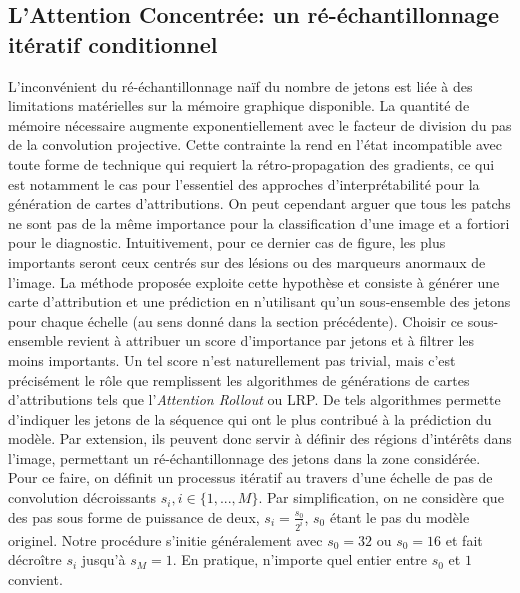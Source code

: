 \subsection{L'Attention Concentrée: un ré-échantillonnage itératif conditionnel}

L'inconvénient du ré-échantillonnage naïf du nombre de jetons est liée à des limitations matérielles sur la mémoire graphique disponible. La quantité de mémoire nécessaire augmente exponentiellement avec le facteur de division du pas de la convolution projective. Cette contrainte la rend en l'état incompatible avec toute forme de technique qui requiert la rétro-propagation des gradients, ce qui est notamment le cas pour l'essentiel des approches d'interprétabilité pour la génération de cartes d'attributions. On peut cependant arguer que tous les patchs ne sont pas de la même importance pour la classification d'une image et a fortiori pour le diagnostic. Intuitivement, pour ce dernier cas de figure, les plus importants seront ceux centrés sur des lésions ou des marqueurs anormaux de l'image. La méthode proposée exploite cette hypothèse et consiste à générer une carte d'attribution et une prédiction en n'utilisant qu'un sous-ensemble des jetons pour chaque échelle (au sens donné dans la section précédente). Choisir ce sous-ensemble revient à attribuer un score d'importance par jetons et à filtrer les moins importants. Un tel score n'est naturellement pas trivial, mais c'est précisément le rôle que remplissent les algorithmes de générations de cartes d'attributions tels que l'\textit{Attention Rollout} ou \ac{LRP}. De tels algorithmes permette d'indiquer les jetons de la séquence qui ont le plus contribué à la prédiction du modèle. Par extension, ils peuvent donc servir à définir des régions d'intérêts dans l'image, permettant un ré-échantillonnage des jetons dans la zone considérée. \\
Pour ce faire, on définit un processus itératif au travers d'une échelle de pas de convolution décroissants $s_i, i \in \{1,...,M\}$. Par simplification, on ne considère que des pas sous forme de puissance de deux, $s_i = \frac{s_0}{2^i}$, $s_0$ étant le pas du modèle originel. Notre procédure s'initie généralement avec $s_0=32$ ou $s_0 = 16$ et fait décroître  $s_i$ jusqu'à $s_M=1$. En pratique, n'importe quel entier entre $s_0$ et $1$ convient. 
